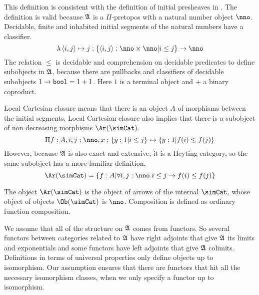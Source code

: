 \documentclass[csh.tex]{subfiles}
\begin{document}
This definition is consistent with the definition of initial presheaves in \citep{MR1300636}. The definition is valid because $\mathfrak A$ is a $\Pi$-pretopos with a natural number object $\nno$. Decidable, finite and inhabited initial segments of the natural numbers have a classifier.
\[  \function{\tuplet{i,j}}j\of\set{\tuplet{i,j}\of\nno\times\nno\middle|i\leq j}\to \nno \]
The relation $\leq$ is decidable and comprehension on decidable predicates to define subobjects in $\mathfrak A$, because there are pullbacks and classifiers of decidable subobjects $1\to \mathtt{bool} = 1+1$. Here $1$ is a terminal object and $+$ a binary coproduct.

Local Cartesian closure means that there is an object $A$ of morphisms between the initial segments. Local Cartesian closure also implies that there is a subobject of non decreasing morphisms $\Ar(\simCat)$.
\[ \product{f\of A,i,j\of\nno,x\of\set{y\of 1|i\leq j}}{\set{y\of 1|f(i)\leq f(j)}}\]
However, because $\mathfrak A$ is also exact and extensive, it is a Heyting category, so the same subobject has a more familiar definition.
\[ \Ar(\simCat)=\set{f\of A|\forall i,j\of\nno.i\leq j \to f(i)\leq f(j)} \]

\begin{definition} The object $\Ar(\simCat)$ is the object of arrows of the internal  $\simCat$, whose object of objects $\Ob(\simCat)$ is $\nno$. Composition is defined as ordinary function composition.
\end{definition}

\begin{remark} We assume that all of the structure on $\mathfrak A$ comes from functors. So several functors between categories related to $\mathfrak A$ have right adjoints that give $\mathfrak A$ its limits and exponentials and some functors have left adjoints that give $\mathfrak A$ colimits. Definitions in terms of universal properties only define objects up to isomorphism. Our assumption ensures that there are functors that hit all the necessary isomorphism classes, when we only specify a functor up to isomorphism.
\end{remark}
\end{document}
